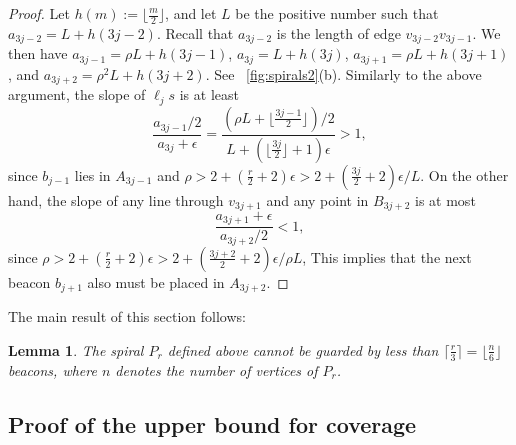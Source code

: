 \documentclass[11pt]{article}
\newtheorem{lemma}{Lemma}
\theoremstyle{definition}
\begin{document}
\begin{proof}
Let $h(m) := \lfloor \frac{m}{2} \rfloor$, and
let $L$ be the positive number such that $a_{3j-2} = L + h(3j-2)$.
Recall that $a_{3j-2}$ is the length of edge $v_{3j-2}v_{3j-1}$.
We then have $a_{3j-1} = \rho L + h(3j-1)$, $a_{3j} = L + h(3j)$, $a_{3j+1} = \rho L + h(3j+1)$,
and $a_{3j+2} = \rho^2 L + h(3j+2)$.
See \figurename~\ref{fig:spirals2}(b).
Similarly to the above argument,
the slope of $\ell_js$ is at least
\[ \frac{a_{3j-1}/2}{a_{3j} + \epsilon} = \frac{(\rho L + \lfloor \frac{3j-1}{2} \rfloor)/2}
  {L+ (\lfloor \frac{3j}{2} \rfloor + 1)\epsilon} > 1,\]
since $b_{j-1}$ lies in $A_{3j-1}$ and
$\rho > 2+ (\frac{r}{2} + 2)\epsilon > 2 + (\frac{3j}{2} + 2)\epsilon / L$.
On the other hand, the slope of any line through $v_{3j+1}$ and any point in $B_{3j+2}$ is at most
\[ \frac{a_{3j+1} + \epsilon}{a_{3j+2}/2} < 1,\]
since $\rho > 2+ (\frac{r}{2} + 2)\epsilon >  2 + (\frac{3j+2}{2} + 2)\epsilon / \rho L$,
This implies that the next beacon $b_{j+1}$ also must be placed in $A_{3j+2}$. 
\end{proof}



The main result of this section follows:
\begin{lemma} \label{lem:coverage_lower_bound}
 The spiral $P_r$ defined above cannot be guarded by less than
 $\lceil \frac{r}{3} \rceil = \lfloor \frac{n}{6} \rfloor$ beacons,
 where $n$ denotes the number of vertices of $P_r$.
\end{lemma}





\subsection{Proof of the upper bound for coverage}\label{subsec:upper_bound_coverage}
\end{document}

